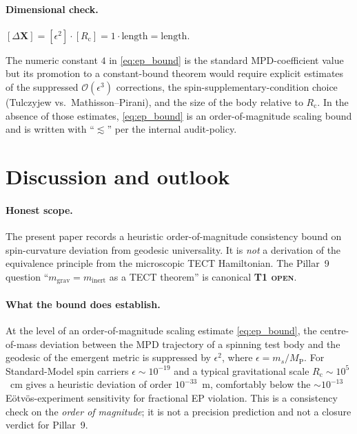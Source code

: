 \paragraph{Dimensional check.}
$[\Delta\mathbf{X}] = [\epsilon^2]\cdot[R_{\mathrm{c}}]
= 1\cdot\mathrm{length} = \mathrm{length}$.

\begin{remark}
\label{rmk:lesssim}
The numeric constant $4$ in \eqref{eq:ep_bound} is the standard
MPD-coefficient value but its promotion to a constant-bound theorem
would require explicit estimates of the suppressed
$\mathcal{O}(\epsilon^3)$ corrections, the spin-supplementary-condition
choice (Tulczyjew vs.\ Mathisson--Pirani), and the size of the body
relative to $R_{\mathrm{c}}$. In the absence of those estimates,
\eqref{eq:ep_bound} is an order-of-magnitude scaling bound and is
written with ``$\lesssim$'' per the internal audit-policy.
\end{remark}

\section{Discussion and outlook}\label{sec:discussion}
\paragraph{Honest scope.}
The present paper records a heuristic order-of-magnitude consistency
bound on spin-curvature deviation from geodesic universality. It is
\emph{not} a derivation of the equivalence principle from the
microscopic TECT Hamiltonian. The Pillar~9 question
``$m_{\mathrm{grav}} = m_{\mathrm{inert}}$ as a TECT theorem'' is
canonical \textbf{T1 \textsc{open}}.

\paragraph{What the bound does establish.}
At the level of an order-of-magnitude scaling estimate
\eqref{eq:ep_bound}, the centre-of-mass deviation between the MPD
trajectory of a spinning test body and the geodesic of the emergent
metric is suppressed by $\epsilon^2$, where $\epsilon = m_s /
M_{\mathrm{P}}$. For Standard-Model spin carriers
$\epsilon \sim 10^{-19}$ and a typical gravitational scale
$R_{\mathrm{c}} \sim 10^{5}$~cm gives a heuristic deviation of order
$10^{-33}$~m, comfortably below the $\sim 10^{-13}$ Eötvös-experiment
sensitivity for fractional EP violation. This is a consistency check
on the \emph{order of magnitude}; it is not a precision prediction
and not a closure verdict for Pillar~9.

